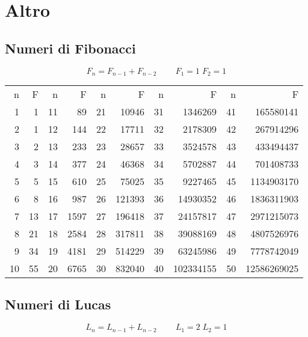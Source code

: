 \chapter{Altro}
\section{Numeri di Fibonacci}
\begin{equation*}
F_n=F_{n-1}+F_{n-2}\qquad\ F_{1}=1\; F_{2}=1 
\end{equation*}

\begin{center}
	\begin{tabular}{*{10}{R}}
\toprule
{} &&&&&&&&&\\
1&1&11&89&21&10946&31&1346269&41&165580141\\
2&1&12&144&22&17711&32&2178309&42&267914296\\
3&2&13&233&23&28657&33&3524578&43&433494437\\
4&3&14&377&24&46368&34&5702887&44&701408733\\
5&5&15&610&25&75025&35&9227465&45&1134903170\\
6&8&16&987&26&121393&36&14930352&46&1836311903\\
7&13&17&1597&27&196418&37&24157817&47&2971215073\\
8&21&18&2584&28&317811&38&39088169&48&4807526976\\
9&34&19&4181&29&514229&39&63245986&49&7778742049\\
10&55&20&6765&30&832040&40&102334155&50&12586269025\\
\bottomrule
\end{tabular} 
\end{center}
\section{Numeri di Lucas}
\begin{equation*}
L_n=L_{n-1}+L_{n-2}\qquad\ L_{1}=2\; L_{2}=1 
\end{equation*}

